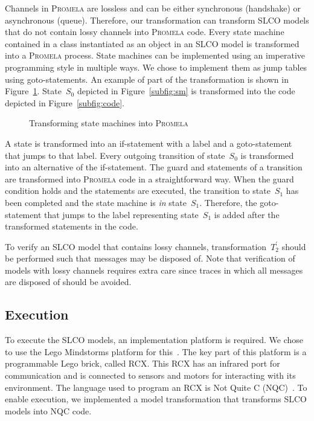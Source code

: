 Channels in \textsc{Promela} are lossless and can be either synchronous (handshake) or asynchronous (queue).
Therefore, our transformation can transform SLCO models that do not contain lossy channels into \textsc{Promela} code.
Every state machine contained in a class instantiated as an object in an SLCO model is transformed into a \textsc{Promela} process.
State machines can be implemented using an imperative programming style in multiple ways.
We chose to implement them as jump tables using goto-statements.
An example of part of the transformation is shown in Figure~\ref{fig:sm2pomela}.
State~$S_0$ depicted in Figure~\ref{subfig:sm} is transformed into the code depicted in Figure~\ref{subfig:code}.
\begin{figure}[hbt]
\centering
{}
\hspace{.2\textwidth}
\caption{Transforming state machines into \textsc{Promela}}
\label{fig:sm2pomela}
\end{figure}
A state is transformed into an if-statement with a label and a goto-statement that jumps to that label.
Every outgoing transition of state~$S_0$ is transformed into an alternative of the if-statement.
The guard and statements of a transition are transformed into \textsc{Promela} code in a straightforward way.
When the guard condition holds and the statements are executed, the transition to state~$S_1$ has been completed and the state machine is \emph{in} state~$S_1$.
Therefore, the goto-statement that jumps to the label representing state~$S_1$ is added after the transformed statements in the code.

To verify an SLCO model that contains lossy channels, transformation~$T_2^\prime$ should be performed such that messages may be disposed of.
Note that verification of models with lossy channels requires extra care since traces in which all messages are disposed of should be avoided.

\subsection{Execution}
To execute the SLCO models, an implementation platform is required.
We chose to use the Lego Mindstorms platform for this~\cite{Lego}.
The key part of this platform is a programmable Lego brick, called RCX.
This RCX has an infrared port for communication and is connected to sensors and motors for interacting with its environment.
The language used to program an RCX is Not Quite C (NQC)~\cite{Baum2003}.
To enable execution, we implemented a model transformation that transforms SLCO models into NQC code.

